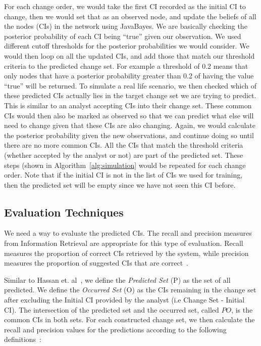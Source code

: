 \documentclass[10pt,twocolumn,letterpaper]{article}
\begin{document}
For each change order, we would take the first CI recorded as the initial CI to change, then we would set that as an observed node, and update
the beliefs of all the nodes (CIs) in the network using JavaBayes. We are basically checking the posterior probability of each CI being ``true'' given our
observation. We used different cutoff thresholds for the posterior probabilities we would consider. We would then loop on all the updated CIs, and add those
that match our threshold criteria to the predicted change set. For example a threshold of 0.2 means that only nodes that have a posterior probability greater
than 0.2 of having the value ``true'' will be returned. To simulate a real life scenario, we then checked which of these predicted CIs actually lies in the
target change set we are trying to predict. This is similar to an analyst accepting CIs into their change set. These common CIs would then also be marked as
observed so that we can predict what else will need to change given that these CIs are also changing. Again, we would calculate the posterior probability given
the new observations, and continue doing so until there are no more common CIs. All the CIs that match the threshold criteria (whether accepted by the analyst
or not) are part of the predicted set. These steps (shown in Algorithm~\ref{alg:simulation} would be repeated for each change order. Note that if the initial
CI is not in the list of CIs we used for training, then the predicted set will be empty since we have not seen this CI before.

\subsection{Evaluation Techniques}

We need a way to evaluate the predicted CIs. The recall and precision measures from Information Retrieval are appropriate for this type of evaluation.
Recall measures the proportion of correct CIs retrieved by the system, while precision measures the proportion of suggested CIs that are correct~\cite{van79}.

Similar to Hassan et. al~\cite{hassan2004predicting}, we define the \textit{Predicted Set} (P) as the set of all predicted. We define the \textit{Occurred
Set} (O) as the CIs remaining in the change set after excluding the Initial CI
provided by the analyst (i.e Change Set - Initial CI). The intersection of the predicted set and the occurred set, called $PO$, is the common CIs in both sets.
For each constructed change set, we then calculate the recall and precision values for the predictions according to the following
definitions~\cite{hassan2004predicting}:
\end{document}
